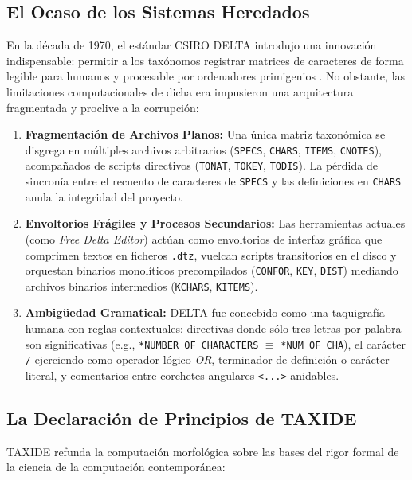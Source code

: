 \documentclass[11pt,a4paper]{article}
\theoremstyle{definition}
\theoremstyle{remark}
\begin{document}
\subsection{El Ocaso de los Sistemas Heredados}
En la década de 1970, el estándar CSIRO DELTA introdujo una innovación indispensable: permitir a los taxónomos registrar matrices de caracteres de forma legible para humanos y procesable por ordenadores primigenios \cite{dallwitz1980}. No obstante, las limitaciones computacionales de dicha era impusieron una arquitectura fragmentada y proclive a la corrupción:
\begin{enumerate}
    \item \textbf{Fragmentación de Archivos Planos:} Una única matriz taxonómica se disgrega en múltiples archivos arbitrarios (\texttt{SPECS}, \texttt{CHARS}, \texttt{ITEMS}, \texttt{CNOTES}), acompañados de scripts directivos (\texttt{TONAT}, \texttt{TOKEY}, \texttt{TODIS}). La pérdida de sincronía entre el recuento de caracteres de \texttt{SPECS} y las definiciones en \texttt{CHARS} anula la integridad del proyecto.
    \item \textbf{Envoltorios Frágiles y Procesos Secundarios:} Las herramientas actuales (como \textit{Free Delta Editor}) actúan como envoltorios de interfaz gráfica que comprimen textos en ficheros \texttt{.dtz}, vuelcan scripts transitorios en el disco y orquestan binarios monolíticos precompilados (\texttt{CONFOR}, \texttt{KEY}, \texttt{DIST}) mediando archivos binarios intermedios (\texttt{KCHARS}, \texttt{KITEMS}).
    \item \textbf{Ambigüedad Gramatical:} DELTA fue concebido como una taquigrafía humana con reglas contextuales: directivas donde sólo tres letras por palabra son significativas (e.g., \texttt{*NUMBER OF CHARACTERS} $\equiv$ \texttt{*NUM OF CHA}), el carácter \texttt{/} ejerciendo como operador lógico \textit{OR}, terminador de definición o carácter literal, y comentarios entre corchetes angulares \texttt{<...>} anidables.
\end{enumerate}

\subsection{La Declaración de Principios de TAXIDE}
TAXIDE refunda la computación morfológica sobre las bases del rigor formal de la ciencia de la computación contemporánea:
\end{document}
